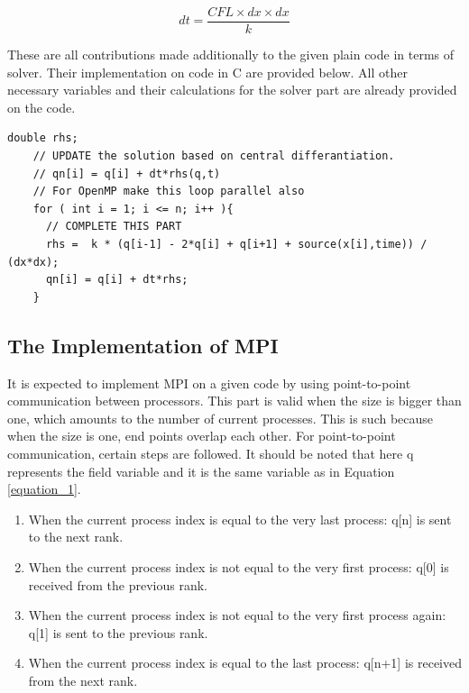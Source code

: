 \documentclass{article}
\begin{document}
\begin{equation} %
    dt = \frac{CFL\times dx\times dx}{k}
    \label{equation_7}
\end{equation}


These are all contributions made additionally to the given plain code in terms of solver. Their implementation on code in C are provided below. All other necessary variables and their calculations for the solver part are already provided on the code. 
\begin{verbatim}
double rhs;
    // UPDATE the solution based on central differantiation.
    // qn[i] = q[i] + dt*rhs(q,t)
    // For OpenMP make this loop parallel also
    for ( int i = 1; i <= n; i++ ){
      // COMPLETE THIS PART
      rhs =  k * (q[i-1] - 2*q[i] + q[i+1] + source(x[i],time)) / (dx*dx); 
      qn[i] = q[i] + dt*rhs;
    }
\end{verbatim}

\subsection{The Implementation of MPI}
It is expected to implement MPI on a given code by using point-to-point communication between processors. This part is valid when the size is bigger than one, which amounts to the number of current processes. This is such because when the size is one, end points overlap each other. For point-to-point communication, certain steps are followed. It should be noted that here q represents the field variable and it is the same variable as in Equation \ref{equation_1}. 

\begin{enumerate}
\color{black}
\item When the current process index is equal to the very last process: q[n] is sent to the next rank. 
\label{item_1}
\item When the current process index is not equal to the very first process: q[0] is received from the previous rank.  
\label{item_2}
\item When the current process index is not equal to the very first process again: q[1] is sent to the previous rank. 
\label{item_3}
\item When the current process index is equal to the last process: q[n+1] is received from the next rank. 
\label{item_4}
\end{enumerate}
\end{document}
